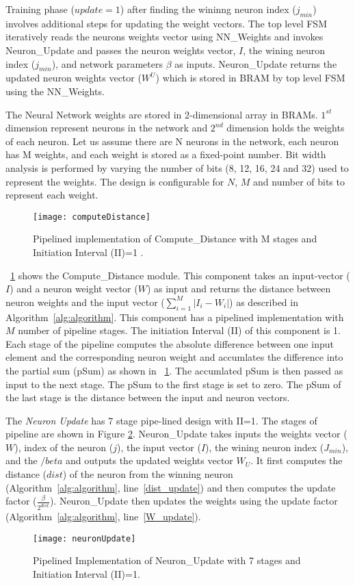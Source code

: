 Training phase ($update{=}1$) after finding the wininng neuron index ($j_{min}$) involves additional steps for updating the weight vectors. The top level FSM iteratively reads the neurons weights vector using NN\_Weights and invokes Neuron\_Update and passes the neuron weights vector, $I$, the wining neuron index ($j_{min}$), and network parameters $\beta$ as inputs. Neuron\_Update returns the updated neuron weights vector ($W^U$) which is stored in BRAM by top level FSM using the NN\_Weights. 

The Neural Network weights are stored in 2-dimensional array in BRAMs. $1^{st}$ dimension represent neurons in the network and $2^{nd}$ dimension holds the weights of each neuron. Let us assume there are N neurons in the network, each neuron has M weights, and each weight is stored as a fixed-point number. Bit width analysis is performed by varying the number of bits (8, 12, 16, 24 and 32) used to represent the weights. The design is configurable for $N$, $M$ and number of bits to represent each weight. 

\begin{figure}[!htb]
	\centering
	\texttt{[image: computeDistance]}
	\caption{Pipelined implementation of Compute\_Distance with M stages and Initiation Interval (II)=1 .}
	\label{fig:ComputeDistance}
\end{figure}
\figurename{~\ref{fig:ComputeDistance}} shows the Compute\_Distance module. This component takes an input-vector ($I$) and a neuron weight vector ($W$) as input and returns the distance between neuron weights and the input vector ($\sum_{i=1}^{M}|I_{i}-W_{i}|$) as described in Algorithm~\ref{alg:algorithm}. This component has a pipelined implementation with $M$ number of pipeline stages. The initiation Interval (II) of this component is 1. Each stage of the pipeline computes the absolute difference between one input element and the corresponding neuron weight and accumlates the difference into the partial sum (pSum) as shown in \figurename{~\ref{fig:ComputeDistance}}. The accumlated pSum is then passed as input to the next stage. The pSum to the first stage is set to zero. The pSum of the last stage is the distance between the input and neuron vectors.

The \textit{Neuron Update} has 7 stage pipe-lined design with II=1. The stages of pipeline are shown in Figure \ref{fig:NeuronUpdate}. Neuron\_Update takes inputs the weights vector ($W$), index of the neuron ($j$), the input vector ($I$), the wining neuron index ($J_{min}$), and the $/beta$ and outputs the updated weights vector $W_U$. 
It first computes the distance ($dist$) of the neuron from the winning neuron (Algorithm~\ref{alg:algorithm}, line~\ref{dist_update}) and then computes the update factor ($\frac{\beta}{2^{dist}}$). Neuron\_Update then updates the weights using the update factor (Algorithm~\ref{alg:algorithm}, line~\ref{W_update}). 
\begin{figure}[!htb]
	\centering
	\texttt{[image: neuronUpdate]}
	\caption{Pipelined Implementation of Neuron\_Update with 7 stages and Initiation Interval (II)=1.}
	\label{fig:NeuronUpdate}
\end{figure}

